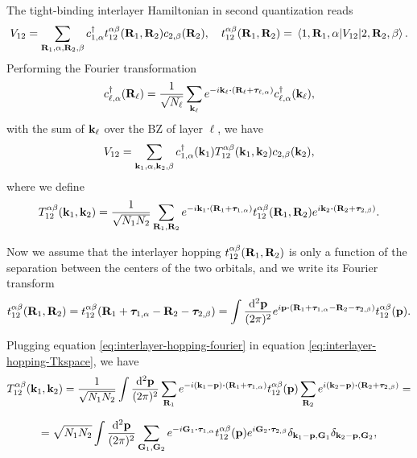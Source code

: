 The tight-binding interlayer Hamiltonian in second quantization reads
\begin{equation} \label{eq:interlayer-hopping}
V_{12} = \sum_{{\vb{R}}_1,\alpha,{\vb{R}}_2,\beta} c_{1,\alpha}^{\dagger} t_{12}^{\alpha\beta}({\vb{R}}_1,{\vb{R}}_2) c_{2,\beta}({\vb{R}}_2), \quad
t_{12}^{\alpha\beta}({\vb{R}}_1,{\vb{R}}_2) =
\mel{1,{\vb{R}}_1,\alpha}{V_{12}}{2,{\vb{R}}_2,\beta}.
\end{equation}
Performing the Fourier transformation
\begin{equation} \label{eq:blg-fourier}
c_{\ell,\alpha}^\d(\R_\ell) = \frac{1}{\sqrt{N_\ell}} \sum_{\k_\ell}
e^{-i\k_\ell \vdot (\R_\ell + \vtau_{\ell,\alpha})} c_{\ell,\alpha}^\d(\k_\ell),
\end{equation}
with the sum of ${\vb{k}}_\ell$ over the BZ of layer $\ell$, we have
\begin{equation} \label{eq:interlayer-hopping-kspace}
V_{12} = \sum_{{\vb{k}}_1,\alpha,{\vb{k}}_2,\beta} c_{1,\alpha}^{\dagger}({\vb{k}}_1) T_{12}^{\alpha\beta}({\vb{k}}_1,{\vb{k}}_2) c_{2,\beta}({\vb{k}}_2),
\end{equation}
where we define
\begin{equation} \label{eq:interlayer-hopping-Tkspace}
T_{12}^{\alpha\beta}(\k_1,\k_2) =
\frac{1}{\sqrt{N_1 N_2}} \sum_{\R_1,\R_2} e^{-i\k_1\vdot(\R_1+\vtau_{1,\alpha})}
t_{12}^{\alpha\beta}(\R_1,\R_2) e^{i\k_2\vdot(\R_2+\vtau_{2,\beta})}.
\end{equation}

Now we assume that the interlayer hopping $t_{12}^{\alpha\beta}({\vb{R}}_1,{\vb{R}}_2)$ is only a function of the separation between the centers of the two orbitals, and we write its Fourier transform
\begin{equation} \label{eq:interlayer-hopping-fourier}
t_{12}^{\alpha\beta}(\R_1,\R_2) = t_{12}^{\alpha\beta}(\R_1+\vtau_{1,\alpha}-\R_2-\vtau_{2,\beta}) =
\int \frac{\dd[2]{\p}}{(2\pi)^2} e^{i \p \vdot (\R_1+\vtau_{1,\alpha}-\R_2-\vtau_{2,\beta})} t_{12}^{\alpha\beta}(\p).
\end{equation}

Plugging equation \ref{eq:interlayer-hopping-fourier} in equation \ref{eq:interlayer-hopping-Tkspace}, we have
$$
T_{12}^{\alpha\beta}(\k_1,\k_2) = \frac{1}{\sqrt{N_1 N_2}} \int \frac{\dd[2]{\p}}{(2\pi)^2}
\sum_{\R_1} e^{-i(\k_1-\p)\vdot(\R_1+\vtau_{1,\alpha})} t_{12}^{\alpha\beta}(\p)
\sum_{\R_2} e^{i(\k_2-\p)\vdot(\R_2+\vtau_{2,\beta})} =
$$

$$
= \sqrt{N_1 N_2} \int \frac{\dd[2]{\p}}{(2\pi)^2}
\sum_{\G_1, \G_2} e^{-i\G_1\vdot\vtau_{1,\alpha}} t_{12}^{\alpha\beta}(\p)
e^{i\G_2\vdot\vtau_{2,\beta}} \delta_{\k_1-\p,\G_1} \delta_{\k_2-\p,\G_2},
$$

